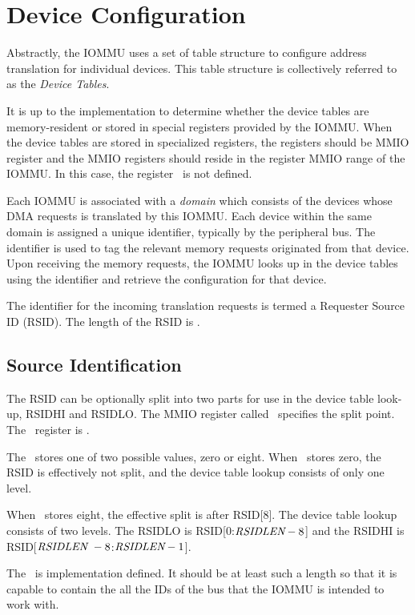 \section{Device Configuration}

Abstractly, the IOMMU uses a set of table structure to configure address translation
for individual devices. This table structure is collectively referred to as the
\textit{Device Tables}.

It is up to the implementation to determine whether the device tables are memory-resident
or stored in special registers provided by the IOMMU. When the device tables are stored in
specialized registers, the registers should be MMIO register and the MMIO registers should
reside in the register MMIO range of the IOMMU. In this case, the register \dtbase\ is not
defined.

Each IOMMU is associated with a \textit{domain} which consists of the devices whose DMA
requests is translated by this IOMMU. Each device within the same domain is assigned a
unique identifier, typically by the peripheral bus. The identifier is used to tag the relevant
memory requests originated from that device. Upon receiving the memory requests, the IOMMU
looks up in the device tables using the identifier and retrieve the configuration for that
device.

The identifier for the incoming translation requests is termed a Requester Source ID
(RSID). The length of the RSID is \rsidlen.

\subsection{Source Identification}

The RSID can be optionally split into two parts for use in the device table look-up,
RSIDHI and RSIDLO. The MMIO register called \rsiddiv\ specifies the split point. The
\rsiddiv\ register is \warl.

The \rsiddiv\ stores one of two possible values, zero or eight. When \rsiddiv\ stores zero,
the RSID is effectively not split, and the device table lookup consists of only one level.

When \rsiddiv\ stores eight, the effective split is after RSID[8]. The device table lookup
consists of two levels. The RSIDLO is RSID[0:$\textit{RSIDLEN} - 8$] and the RSIDHI is
RSID[$\textit{RSIDLEN}\ - 8$:$\textit{RSIDLEN} - 1$].


The \rsidlen\ is implementation defined. It should be at least such a length so that it is
capable to contain the all the IDs of the bus that the IOMMU is intended to work with.

